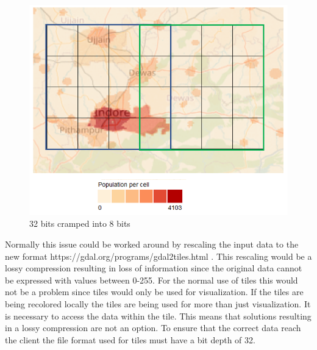 \begin{figure} [H]
	\centering
	\includegraphics[width=.8\textwidth]{Pictures/WhyColorLocallyMap}
	\caption{32 bits cramped into 8 bits}
	\label{WhyColorLocallyMap}
\end{figure}

Normally this issue could be worked around by rescaling the input data to the new format https://gdal.org/programs/gdal2tiles.html . This rescaling would be a lossy compression resulting in loss of information since the original data cannot be expressed with values between 0-255. \citep{dent}
For the normal use of tiles this would not be a problem since tiles would only be used for visualization. 
If the tiles are being recolored locally the tiles are being used for more than just visualization. It is necessary to access the data within the tile. This means that solutions resulting in a lossy compression are not an option. To ensure that the correct data reach the client the file format used for tiles must have a bit depth of 32. 



